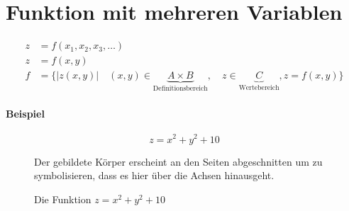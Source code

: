\section{Funktion mit mehreren Variablen}

\begin{align*}
	z & = f (x_1, x_2, x_3, \ldots)                                                                                                                                       \\
	z & = f (x, y)                                                                                                                                                        \\
	f & = \{ \lvert z (x, y) \rvert \quad (x, y) \in \underbrace{A \times B}_{\text{Definitionsbereich}},\quad z \in \underbrace{C}_{\text{Wertebereich}}, z = f(x, y) \}
\end{align*}

\paragraph{Beispiel}

\[
	z = x^2 + y^2 + 10
\]

\begin{figure}[H]
	\centering
	
	\caption{Die Funktion \(z = x^2 + y^2 + 10\)}
	Der gebildete Körper erscheint an den Seiten abgeschnitten um zu symbolisieren, dass es hier über die Achsen hinausgeht.
\end{figure}



